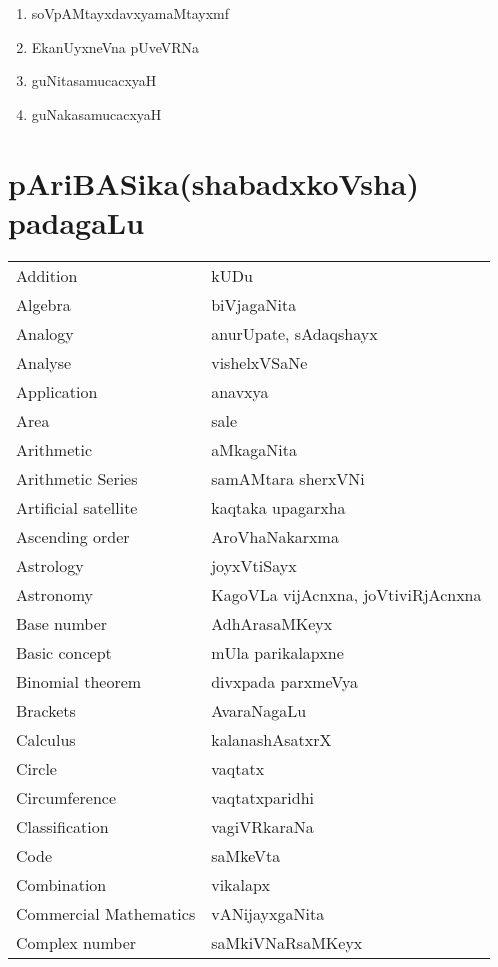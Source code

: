 {\begin{enumerate}[\rm 1)]
\item soVpAMtayxdavxyamaMtayxmf

\item EkanUyxneVna pUveVRNa

\item guNitasamucacxyaH

\item guNakasamucacxyaH
\end{enumerate}

\section*{pAriBASika(shabadxkoVsha) padagaLu}

\begin{longtable}{>{\rm}l@{\hspace{1cm}}l}
Addition & kUDu\\
Algebra & biVjagaNita\\
Analogy & anurUpate, sAdaqshayx\\
Analyse & vishelxVSaNe\\
Application & anavxya\\
Area & sale\\
Arithmetic & aMkagaNita\\
Arithmetic Series & samAMtara sherxVNi\\
Artificial satellite & kaqtaka upagarxha\\
Ascending order & AroVhaNakarxma\\
Astrology & joyxVtiSayx\\
Astronomy & KagoVLa vijAcnxna, joVtiviRjAcnxna\\
Base number & AdhArasaMKeyx\\
Basic concept & mUla parikalapxne\\
Binomial theorem & divxpada parxmeVya\\
Brackets &  AvaraNagaLu\\
Calculus & kalanashAsatxrX\\
Circle & vaqtatx\\
Circumference & vaqtatxparidhi\\
Classification & vagiVRkaraNa\\
Code & saMkeVta\\
Combination & vikalapx\\
Commercial Mathematics & vANijayxgaNita\\
Complex number & saMkiVNaRsaMKeyx\\

\end{longtable}}
